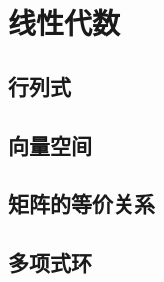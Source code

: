 \part{线性代数}
\begingroup
\def\x{\mat{X}}
\def\y{\mat{Y}}
\def\a{\mat{\alpha}}
\def\b{\mat{\beta}}
\def\e{\mat{\varepsilon}}
\def\g{\mat{\gamma}}
\def\X#1{\x_{#1}}
\def\A{\mat{A}}
\def\wA{\widetilde{\A}}
\def\B{\mat{B}}
\def\wB{\widetilde{\B}}
\def\C{\mat{C}}
\def\D{\mat{D}}
\def\P{\mat{P}}
\def\Q{\mat{Q}}
\def\l{\lambda}
\def\L#1{\l_{#1}}
\def\z{\mat{0}}
\def\E{\mat{E}}
\def\V{\mat{\Lambda}}









\chapter{行列式}








\chapter{向量空间}










\chapter{矩阵的等价关系}





\chapter{多项式环}


\endgroup
